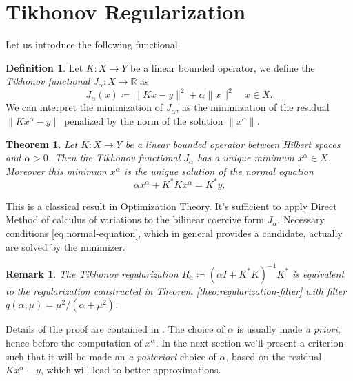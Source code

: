 \documentclass[10pt, a4paper, twoside, openright]{book}
\theoremstyle{definition}
\newtheorem{definition}[subsection]{Definition}
\theoremstyle{plain}
\newtheorem{theorem}[subsection]{Theorem}
\theoremstyle{plain}
\theoremstyle{plain}
\theoremstyle{plain}
\newtheorem{remark}[subsection]{Remark}
\theoremstyle{plain}
\theoremstyle{plain}
\theoremstyle{plain}
\theoremstyle{plain}
\begin{document}
\section{Tikhonov Regularization}
Let us introduce the following functional.
\begin{definition}
 Let $K:X\to Y$ be a linear bounded operator, we define the \emph{Tikhonov functional} $J_\alpha:X\to \mathbb{R}$ as
 \begin{equation}
  J_\alpha(x)\coloneqq\|Kx - y\|^2 + \alpha\|x\|^2\quad x\in X.\label{eq:def-tikhonov-func}
 \end{equation}
 We can interpret the minimization of $J_\alpha$, as the minimization of the residual $\|Kx^{\alpha} - y\|$ penalized by the norm of the solution $\|x^\alpha\|$.
\end{definition}
\begin{theorem}
 Let $K:X\to Y$ be a linear bounded operator between Hilbert spaces and $\alpha>0$. Then the Tikhonov functional $J_\alpha$ 
 has a unique minimum $x^\alpha\in X$. Moreover this minimum $x^\alpha$ is the unique solution of the \emph{normal equation}
 \begin{equation}
  \alpha x^\alpha + K^*Kx^\alpha = K^*y.\label{eq:normal-equation}
 \end{equation}
\end{theorem}
This is a classical result in Optimization Theory. It's sufficient to apply Direct Method of calculus of variations
to the bilinear coercive form $J_\alpha$.  
Necessary conditions \eqref{eq:normal-equation}, which in general provides a candidate, actually are solved by the minimizer.
\begin{remark}
 The Tikhonov regularization $R_\alpha\coloneqq (\alpha I + K^*K)^{-1}K^*$ is equivalent 
 to the regularization constructed in Theorem \ref{theo:regularization-filter} with filter 
 $q(\alpha,\mu) = \mu^2/(\alpha + \mu^2)$.
\end{remark}
Details of the proof are contained in \cite{kirsch:book}.
The choice of $\alpha$ is usually made \emph{a priori}, hence before the computation of $x^\alpha$. In the next section 
we'll present a criterion such that it will be made an \emph{a posteriori} choice of $\alpha$, based on the residual $Kx^\alpha - y$, which will lead to better approximations.
\end{document}
